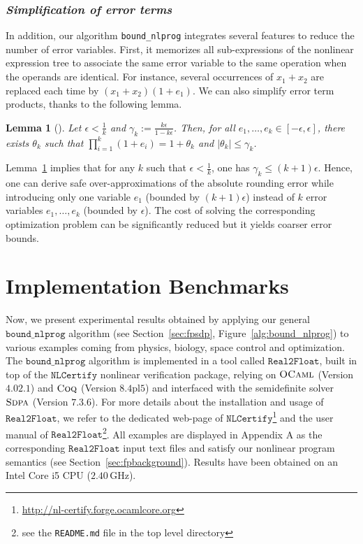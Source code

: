 \documentclass[preprint]{sigplanconf}
\newcommand{\code}[1]{\lstinline{#1}}
\newcommand{\boundnlprog}{\mathtt{bound\_nlprog}}
\newcommand{\realtofloat}{\mathtt{Real2Float}}
\newcommand{\coq}{\text{\sc Coq}}
\newcommand{\ocaml}{\text{\sc OCaml}}
\newcommand{\sdpa}{\text{\sc Sdpa}}
\newcommand{\nlcertify}{\mathtt{NLCertify}}
\newtheorem{lemma}[theorem]{Lemma}
\theoremstyle{plain}
\begin{document}
\subsubsection*{\textit{Simplification of error terms}}
%
In addition, our algorithm \code{bound_nlprog} integrates several features to reduce the number of error variables. First, it memorizes all sub-expressions of the nonlinear expression tree to associate  the same error variable to the same operation when the operands are identical. For instance, several occurrences of $x_1 + x_2$ are replaced each time by $(x_1 + x_2) (1 + e_1)$.
We can also simplify error term products, thanks to the following lemma.
\begin{lemma}[]
\label{th:redproduct}
Let $\epsilon < \frac{1}{k}$ and $\gamma_k := \frac{k \epsilon}{1 - k \epsilon}$. Then, for all $e_1, \dots, e_k \in [-\epsilon, \epsilon]$, there exists $\theta_k$ such that ${\displaystyle \prod_{i=1}^k (1 + e_i) = 1 + \theta_k}$ and $\mid \theta_k \mid \leq \gamma_k$.
\end{lemma}
Lemma~\ref{th:redproduct} implies that for any $k$ such that $\epsilon < \frac{1}{k}$, one has $\gamma_k \leq (k + 1) \epsilon$. Hence, one can derive safe over-approximations of the absolute rounding error while introducing only one variable $e_1$ (bounded by $(k + 1) \epsilon$) instead of $k$ error variables $e_1, \dots, e_k$ (bounded by $\epsilon$). The cost of solving the corresponding optimization problem can be significantly reduced but it yields coarser error bounds.
%
\section{Implementation Benchmarks}
\label{sec:benchs}
%
Now, we present experimental results obtained by applying our general $\boundnlprog$ algorithm (see Section~\ref{sec:fpsdp}, Figure~\ref{alg:bound_nlprog}) to various examples coming from physics, biology, space control and optimization. 
The  $\boundnlprog$ algorithm is implemented in a tool called $\realtofloat$, built in top of the $\nlcertify$ nonlinear verification package, relying on $\ocaml$ (Version $4.02.1$) and $\coq$ (Version $8.4\text{pl}5$) and interfaced with the semidefinite solver $\sdpa$ (Version $7.3.6$). 
For more details about the installation and usage of $\realtofloat$, we refer to the dedicated web-page of $\nlcertify$\footnote{\url{http://nl-certify.forge.ocamlcore.org}} and the user manual of $\realtofloat$\footnote{see the \texttt{README.md} file in the top level directory}. 
All examples are displayed in Appendix A as the corresponding $\realtofloat$ input text files and satisfy our nonlinear program semantics (see Section~\ref{sec:fpbackground}). Results have been obtained on an Intel Core i5 CPU ($2.40\, $GHz).
%
\end{document}
